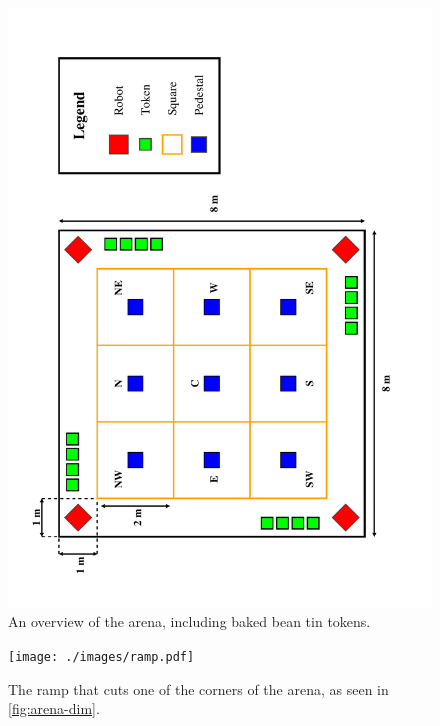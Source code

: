 \begin{figure}
  \includegraphics[keepaspectratio, clip, width=\textwidth]{./images/arena.pdf}
  \caption{\label{fig:arena-dim}An overview of the arena, including baked bean tin tokens.}
\end{figure}

\begin{figure}
  \begin{center}
    \texttt{[image: ./images/ramp.pdf]}
  \end{center}
  \caption{\label{fig:ramp-on-its-own}The ramp that cuts one of the corners of the arena, as seen in \autoref{fig:arena-dim}.}
\end{figure}

